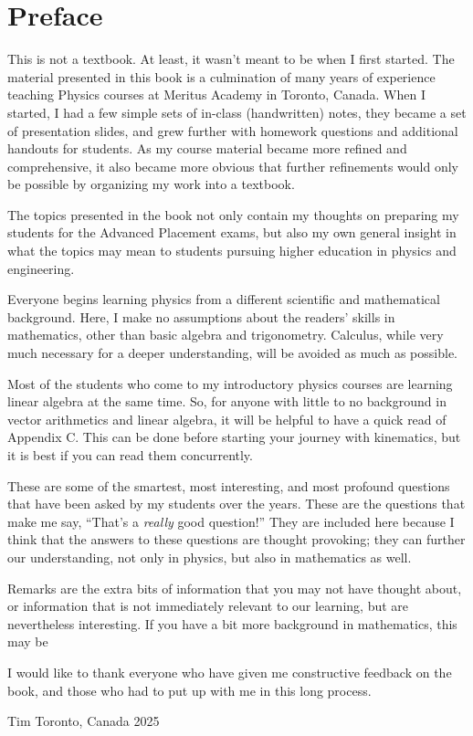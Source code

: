 \chapter*{Preface}

This is not a textbook. At least, it wasn't meant to be when I first started.
The material presented in this book is a culmination of many years of
experience teaching Physics courses at Meritus Academy in Toronto, Canada.
When I started, I had a few simple sets of in-class (handwritten) notes, they
became a set of presentation slides, and grew further with homework questions
and additional handouts for students. As my course material became more refined
and comprehensive, it also became more obvious that further refinements would
only be possible by organizing my work into a textbook.

The topics presented in the book not only contain my thoughts on preparing my
students for the Advanced Placement exams, but also my own general insight in
what the topics may mean to students pursuing higher education in physics and
engineering.

Everyone begins learning physics from a different scientific and mathematical
background. Here, I make no assumptions about the readers' skills in
mathematics,  other than basic algebra and trigonometry. Calculus, while very
much necessary for a deeper understanding, will be avoided as much as possible.

Most of the students who come to my introductory physics courses are learning
linear algebra at the same time. So, for anyone with little to no background in
vector arithmetics and linear algebra, it will be helpful to have a quick read
of Appendix C. This can be done before starting your journey with kinematics,
but it is best if you can read them concurrently.

\begin{common-question}
  These are some of the smartest, most interesting, and most profound questions
  that have been asked by my students over the years. These are the questions
  that make me say, ``That's a \emph{really} good question!'' They are included
  here because I think that the answers to these questions are thought
  provoking; they can further our understanding, not only in physics, but also
  in mathematics as well.
\end{common-question}

\begin{remark}
  Remarks are the extra bits of information that you may not have thought
  about, or information that is not immediately relevant to our learning, but
  are nevertheless interesting. If you have a bit more background in
  mathematics, this may be
\end{remark}

I would like to thank everyone who have given me constructive feedback on the
book, and those who had to put up with me in this long process.

\vspace{.5in}
Tim
Toronto, Canada
2025
